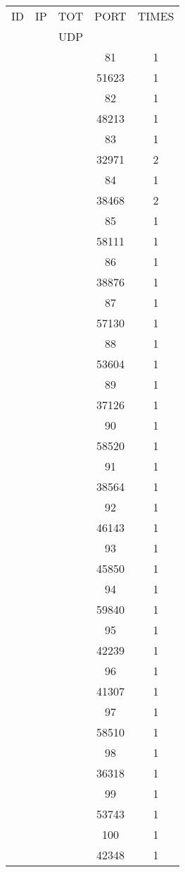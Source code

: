 \documentclass[a4paper]{scrartcl}
\begin{document}
\begin{minipage}[b]{0.5\linewidth}
\begin{tabular}{| c | c | c | c | c |}
\hline
ID & IP & TOT & PORT & TIMES \\ 
   &    & UDP &      &       \\ 
\hline
& & & 81 & 1 \\ & & & 51623 & 1 \\ & & & 82 & 1 \\ & & & 48213 & 1 \\ & & & 83 & 1 \\ & & & 32971 & 2 \\ & & & 84 & 1 \\ & & & 38468 & 2 \\ & & & 85 & 1 \\ & & & 58111 & 1 \\ & & & 86 & 1 \\ & & & 38876 & 1 \\ & & & 87 & 1 \\ & & & 57130 & 1 \\ & & & 88 & 1 \\ & & & 53604 & 1 \\ & & & 89 & 1 \\ & & & 37126 & 1 \\ & & & 90 & 1 \\ & & & 58520 & 1 \\ & & & 91 & 1 \\ & & & 38564 & 1 \\ & & & 92 & 1 \\ & & & 46143 & 1 \\ & & & 93 & 1 \\ & & & 45850 & 1 \\ & & & 94 & 1 \\ & & & 59840 & 1 \\ & & & 95 & 1 \\ & & & 42239 & 1 \\ & & & 96 & 1 \\ & & & 41307 & 1 \\ & & & 97 & 1 \\ & & & 58510 & 1 \\ & & & 98 & 1 \\ & & & 36318 & 1 \\ & & & 99 & 1 \\ & & & 53743 & 1 \\ & & & 100 & 1 \\ & & & 42348 & 1 \\ \hline\end{tabular}\end{minipage} \hfill\begin{minipage}[b]{0.5\linewidth}\begin{tabular}{| c | c | c | c | c |}

\end{tabular}
\end{minipage}
\end{document}

